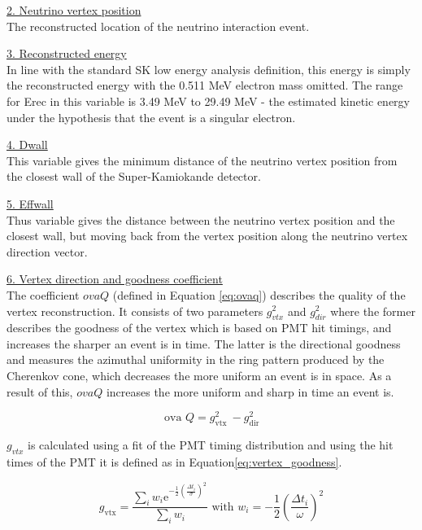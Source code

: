 \noindent
\underline{2. Neutrino vertex position}\\
\noindent 
The reconstructed location of the neutrino interaction event.

\noindent
\underline{3. Reconstructed energy}\\
\noindent 
In line with the standard SK low energy analysis definition, this energy is simply the reconstructed energy with the 0.511 MeV electron mass omitted. The range for Erec in this variable is 3.49 MeV to 29.49 MeV - the estimated kinetic energy under the hypothesis that the event is a singular electron.

\noindent
\underline{4. Dwall}\\
\noindent 
This variable gives the minimum distance of the neutrino vertex position from the closest wall of the Super-Kamiokande detector.

\noindent
\underline{5. Effwall}\\
\noindent 
Thus variable gives the distance between the neutrino vertex position and the closest wall, but moving back from the vertex position along the neutrino vertex direction vector.

\noindent
\underline{6. Vertex direction and goodness coefficient}\\
\noindent 
The coefficient $ovaQ$ (defined in Equation \ref{eq:ovaq}) describes the quality of the vertex reconstruction. It consists of two parameters $g^2_{vtx}$ and $g^2_{dir}$ where the former describes the goodness of the vertex which is based on PMT hit timings, and increases the sharper an event is in time. The latter is the directional goodness and measures the azimuthal uniformity in the ring pattern produced by the Cherenkov cone, which decreases the more uniform an event is in space. As a result of this, $ovaQ$ increases the more uniform and sharp in time an event is.

\begin{equation}
    \text { ova } Q=g_{\text {vtx }}^{2}-g_{\text {dir }}^{2}
    \label{eq:ovaq}
\end{equation}

$g_{vtx}$ is calculated using a fit of the PMT timing distribution and using the hit times of the PMT it is defined as in Equation\ref{eq:vertex_goodness}.

\begin{equation}
g_{\mathrm{vtx}}=\frac{\sum_{i} w_{i} \mathrm{e}^{-\frac{1}{2}(\frac{\Delta t_{i}}{\sigma})^{2}}}{\sum_{i} w_{i}} \text { with } w_{i}=-\frac{1}{2}(\frac{\Delta t_{i}}{\omega})^{2}
\label{eq:vertex_goodness}
\end{equation}

